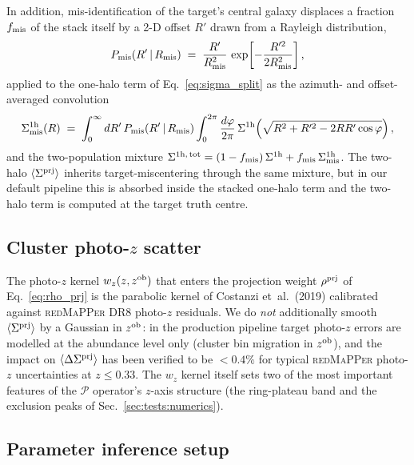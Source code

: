 \documentclass[a4paper, 11pt]{article}
\newcommand{\zob}{z^{\rm ob}}
\newcommand{\Pop}{\mathcal{P}}
\newcommand{\rhoprj}{\rho^{\rm prj}}
\newcommand{\Sprj}{\Sigma^{\rm prj}}
\newcommand{\DSprj}{\Delta\Sigma^{\rm prj}}
\newcommand{\Rmis}{R_{\rm mis}}
\newcommand{\avg}[1]{\langle #1 \rangle}
\begin{document}
In addition, mis-identification of the target's central galaxy
displaces a fraction $f_{\rm mis}$ of the stack itself by a 2-D offset
$R'$ drawn from a Rayleigh distribution,
\begin{equation}
P_{\rm mis}(R'\,|\,\Rmis) \;=\;
\frac{R'}{\Rmis^{2}}\,\exp\!\left[-\frac{R'^{2}}{2\Rmis^{2}}\right] ,
\label{eq:Pmis}
\end{equation}
applied to the one-halo term of Eq.~\eqref{eq:sigma_split} as the
azimuth- and offset-averaged convolution
\begin{equation}
\Sigma^{\rm 1h}_{\rm mis}(R) \;=\;
\int_{0}^{\infty} dR'\,P_{\rm mis}(R'\,|\,\Rmis)
\int_{0}^{2\pi} \frac{d\varphi}{2\pi}\,
\Sigma^{\rm 1h}\!\left(\sqrt{R^{2}+R'^{2}-2RR'\cos\varphi}\right) ,
\label{eq:S1h_mis}
\end{equation}
and the two-population mixture
$\Sigma^{\rm 1h,\,tot}=(1-f_{\rm mis})\,\Sigma^{\rm 1h}+
 f_{\rm mis}\,\Sigma^{\rm 1h}_{\rm mis}$.
The two-halo $\avg{\Sprj}$ inherits target-miscentering through the
same mixture, but in our default pipeline this is absorbed inside the
stacked one-halo term and the two-halo term is computed at the target
truth centre.

\subsection{\texorpdfstring{Cluster photo-$z$ scatter}{Cluster photo-z scatter}}
\label{sec:photoz}

The photo-$z$ kernel $w_z(z,\zob)$ that enters the projection weight
$\rhoprj$ of Eq.~\eqref{eq:rho_prj} is the parabolic kernel of
Costanzi et~al.\ (2019) calibrated against \textsc{redMaPPer} DR8
photo-$z$ residuals.  We do \emph{not} additionally smooth $\avg{\Sprj}$
by a Gaussian in $\zob$: in the production pipeline target photo-$z$
errors are modelled at the abundance level only (cluster bin migration
in $\zob$), and the impact on $\avg{\DSprj}$ has been verified to be
$<0.4\%$ for typical \textsc{redMaPPer} photo-$z$ uncertainties at
$z\le 0.33$.  The $w_z$ kernel itself sets two of the most important
features of the $\Pop$ operator's $z$-axis structure (the ring-plateau
band and the exclusion peaks of Sec.~\ref{sec:tests:numerics}).

\subsection{Parameter inference setup}
\label{sec:inference}
\end{document}
